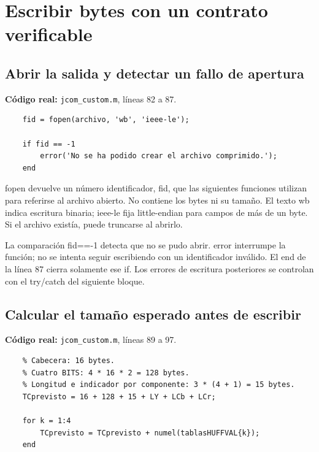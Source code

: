 \documentclass[11pt,a4paper,oneside]{report}
\begin{document}
\section{Escribir bytes con un contrato verificable}

\par\medskip\noindent\begin{minipage}{\linewidth}

\subsection{Abrir la salida y detectar un fallo de apertura}

\textbf{Código real:} \texttt{jcom\_custom.m}, líneas 82 a 87.

\begin{lstlisting}[firstnumber=82]
    % PASO 9: escribir el archivo comprimido.
    fid = fopen(archivo, 'wb', 'ieee-le');

    if fid == -1
        error('No se ha podido crear el archivo comprimido.');
    end
\end{lstlisting}

\end{minipage}\par


fopen devuelve un número identificador, fid, que las siguientes funciones
utilizan para referirse al archivo abierto. No contiene los bytes ni su tamaño.
El texto wb indica escritura binaria; ieee-le fija little-endian para campos
de más de un byte. Si el archivo existía, puede truncarse al abrirlo.

La comparación fid==-1 detecta que no se pudo abrir. error interrumpe la
función; no se intenta seguir escribiendo con un identificador inválido.
El end de la línea 87 cierra solamente ese if. Los errores de escritura
posteriores se controlan con el try/catch del siguiente bloque.


\par\medskip\noindent\begin{minipage}{\linewidth}

\subsection{Calcular el tamaño esperado antes de escribir}

\textbf{Código real:} \texttt{jcom\_custom.m}, líneas 89 a 97.

\begin{lstlisting}[firstnumber=89]
    % Tamano esperado: cabecera, tablas y componentes.
    % Cabecera: 16 bytes.
    % Cuatro BITS: 4 * 16 * 2 = 128 bytes.
    % Longitud e indicador por componente: 3 * (4 + 1) = 15 bytes.
    TCprevisto = 16 + 128 + 15 + LY + LCb + LCr;

    for k = 1:4
        TCprevisto = TCprevisto + numel(tablasHUFFVAL{k});
    end
\end{lstlisting}

\end{minipage}\par
\end{document}
